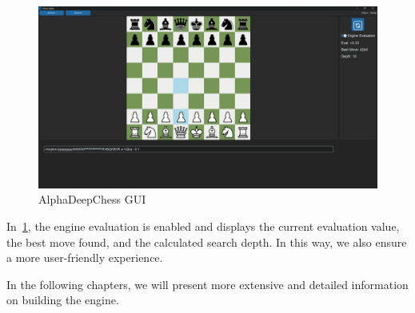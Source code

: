 \begin{center}
    \begin{figure}[H]
    \centering
        \includegraphics[width=1.0\textwidth]{Imagenes/gui.png}
        \caption{AlphaDeepChess GUI}\label{fig:gui}
    \end{figure}
\end{center}

\noindent In~\cref{fig:gui}, the engine evaluation is enabled and displays the current evaluation value, the best move found, and the calculated search depth. In this way, we also ensure a more user-friendly experience.

\vspace{1em}

\noindent In the following chapters, we will present more extensive and detailed information on building the engine.
